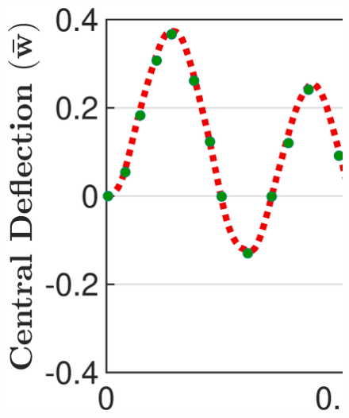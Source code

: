 \documentclass[3p,preprint,12pt]{elsarticle}
\begin{document}
\begin{figure}
	\centering
	\begin{minipage}{\textwidth}
		\graphicspath{{./All_Images./}}
		\centering
		{\includegraphics[scale=0.3]{Structure_b_2_Tri_IGA_NPSDT_Transient_h_By_a_1_20.eps}}
	\end{minipage}\vspace{0.5cm}
	\begin{minipage}{\textwidth}
		\graphicspath{{./All_Images./}}
		\centering

\end{minipage}
\end{figure}
\end{document}
